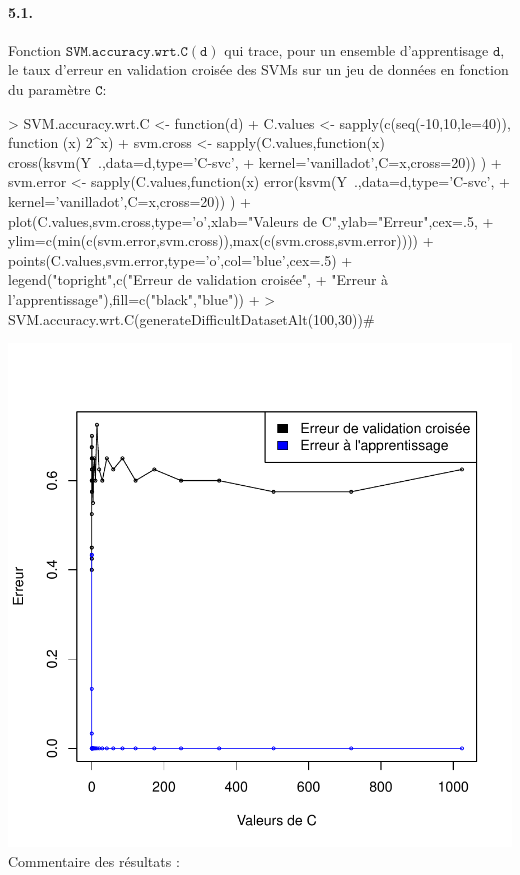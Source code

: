 \documentclass{article}
\begin{document}
\paragraph{5.1.}Fonction $\mathtt{SVM.accuracy.wrt.C(d)}$ qui trace, 
pour un ensemble d'apprentisage $\mathtt{d}$, le taux d'erreur en 
validation croisée des SVMs sur un jeu de données en fonction du 
paramètre $\mathtt{C}$:
\begin{Schunk}
\begin{Sinput}
> SVM.accuracy.wrt.C <- function(d) {
+ 	C.values <- sapply(c(seq(-10,10,le=40)), function (x) 2^x)
+ 	svm.cross <- sapply(C.values,function(x) cross(ksvm(Y~.,data=d,type='C-svc',
+ 			kernel='vanilladot',C=x,cross=20)) )
+ 	svm.error <- sapply(C.values,function(x) error(ksvm(Y~.,data=d,type='C-svc',
+ 			kernel='vanilladot',C=x,cross=20)) ) 
+ 	plot(C.values,svm.cross,type='o',xlab="Valeurs de C",ylab="Erreur",cex=.5,
+ 			ylim=c(min(c(svm.error,svm.cross)),max(c(svm.cross,svm.error))))
+ 	points(C.values,svm.error,type='o',col='blue',cex=.5)
+ 	legend("topright",c("Erreur de validation croisée",
+ 			"Erreur à l'apprentissage"),fill=c("black","blue"))
+ }
> SVM.accuracy.wrt.C(generateDifficultDatasetAlt(100,30))#
\end{Sinput}
\end{Schunk}
\includegraphics{rapport-SVMaccuracywrtC}
\newline
Commentaire des résultats :
\end{document}
